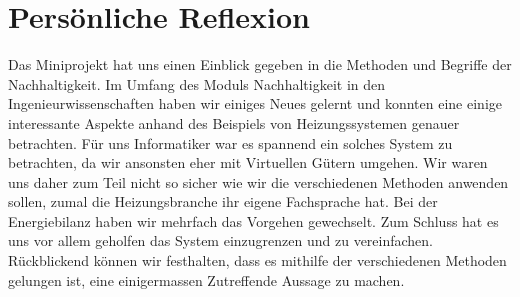 \chapter{Persönliche Reflexion}
\label{chap:reflexion}

Das Miniprojekt hat uns einen Einblick gegeben in die Methoden und Begriffe
der Nachhaltigkeit.
Im Umfang des Moduls Nachhaltigkeit in den Ingenieurwissenschaften haben wir
einiges Neues gelernt und konnten eine einige interessante Aspekte anhand
des Beispiels von Heizungssystemen genauer betrachten.
Für uns Informatiker war es spannend ein solches System zu betrachten, da wir
ansonsten eher mit Virtuellen Gütern umgehen.
Wir waren uns daher zum Teil nicht so sicher wie wir die verschiedenen Methoden
anwenden sollen, zumal die Heizungsbranche ihr eigene Fachsprache hat.
Bei der Energiebilanz haben wir mehrfach das Vorgehen gewechselt.
Zum Schluss hat es uns vor allem geholfen das System einzugrenzen und zu
vereinfachen.
Rückblickend können wir festhalten, dass es mithilfe der verschiedenen Methoden
gelungen ist, eine einigermassen Zutreffende Aussage zu machen.

